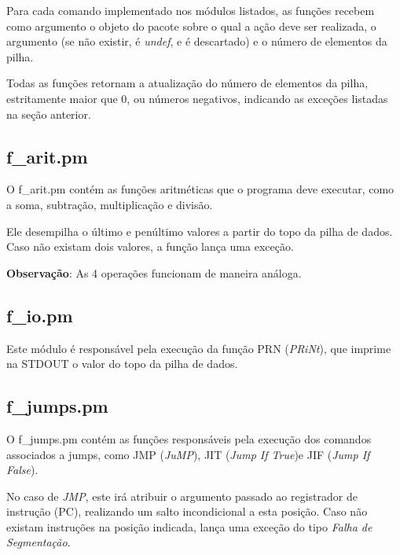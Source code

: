 \documentclass[a4paper]{article}
\begin{document}
        Para cada comando implementado nos módulos listados, as funções
        recebem como argumento o objeto do pacote sobre o qual a ação 
        deve ser realizada, o argumento (se não existir, é \emph{undef},
        e é descartado) e o número de elementos da pilha.
        
        Todas as funções retornam a atualização do número de elementos
        da pilha, estritamente maior que 0, ou números negativos, 
        indicando as exceções listadas na seção anterior.

    \subsection{f\_arit.pm}
        
        O f\_arit.pm contém as funções aritméticas que o programa deve
        executar, como a soma, subtração, multiplicação e divisão.
        
        Ele desempilha o último e penúltimo valores a partir do topo 
        da pilha de dados. Caso não existam dois valores, a função 
        lança uma exceção.
        
        \textbf{Observação}: As 4 operações funcionam de maneira
        análoga.        
        
    \subsection{f\_io.pm}
        
        Este módulo é responsável pela execução da função PRN 
        (\emph{PRiNt}), que imprime na STDOUT o valor do topo da 
        pilha de dados.
            
    \subsection{f\_jumps.pm}
        
        O f\_jumps.pm contém as funções responsáveis pela execução dos
        comandos associados a jumps, como JMP (\emph{JuMP}), JIT 
        (\emph{Jump If True})e JIF (\emph{Jump If False}).
        
        No caso de \emph{JMP}, este irá atribuir o argumento passado 
        ao registrador de instrução (PC), realizando um salto 
        incondicional a esta posição. Caso não existam instruções
        na posição indicada, lança uma exceção do tipo \emph{Falha
        de Segmentação}.
        
\end{document}
